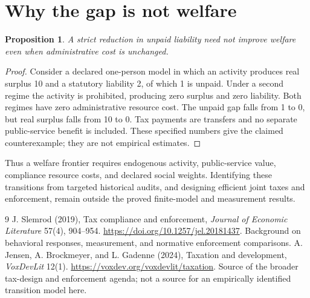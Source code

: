 \documentclass[11pt,a4paper]{article}
\newtheorem{proposition}[theorem]{Proposition}
\theoremstyle{definition}
\theoremstyle{remark}
\begin{document}
\section{Why the gap is not welfare}
\begin{proposition}
A strict reduction in unpaid liability need not improve welfare even when administrative cost is unchanged.
\end{proposition}
\begin{proof}
Consider a declared one-person model in which an activity produces real surplus 10 and a statutory liability 2, of which 1 is unpaid. Under a second regime the activity is prohibited, producing zero surplus and zero liability. Both regimes have zero administrative resource cost. The unpaid gap falls from 1 to 0, but real surplus falls from 10 to 0. Tax payments are transfers and no separate public-service benefit is included. These specified numbers give the claimed counterexample; they are not empirical estimates.
\end{proof}
Thus a welfare frontier requires endogenous activity, public-service value, compliance resource costs, and declared social weights. Identifying these transitions from targeted historical audits, and designing efficient joint taxes and enforcement, remain outside the proved finite-model and measurement results.
\begin{thebibliography}{9}
 J. Slemrod (2019), Tax compliance and enforcement, \emph{Journal of Economic Literature} 57(4), 904--954. \url{https://doi.org/10.1257/jel.20181437}. Background on behavioral responses, measurement, and normative enforcement comparisons.
 A. Jensen, A. Brockmeyer, and L. Gadenne (2024), Taxation and development, \emph{VoxDevLit} 12(1). \url{https://voxdev.org/voxdevlit/taxation}. Source of the broader tax-design and enforcement agenda; not a source for an empirically identified transition model here.
\end{thebibliography}
\end{document}
